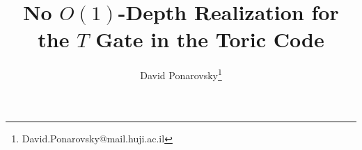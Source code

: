 \documentclass[manuscript,screen,review]{acmart}
\begin{document}

\title{ No $O(1)$-Depth Realization for the $T$ Gate in the Toric Code}
\author{David Ponarovsky\footnote{David.Ponarovsky@mail.huji.ac.il}}
\maketitle

\newcommand*{\xb}{\mathbf{x}}

\ifdefined\SWEEPHEA
\else 
  \newcommand*{\SWEEPHEA}{}
\newcommand{\History}[1]{H_{#1}}
  \newcommand{\Time}[1]{T(#1)}
  \newcommand{\Excuse}[1]{\mathbf{Excuse}(#1)}
  \newcommand{\Excusei}[1]{\mathbf{Excuse}_{i}(#1)}
  \newcommand{\Size}[1]{\mathbf{Size}(#1)}
  \newcommand{\Span}[1]{\mathbf{Span}(#1)}
  \newcommand{\pre}[1]{\text{pre}(#1)}
  \newcommand{\poli}[1]{\text{pole}_{i}(#1)}
  \newcommand{\prei}[1]{\text{pre}_{i}(#1)}
  \newcommand{\predd}[1]{\text{pre}_{d+1}(#1)}
  \newcommand{\rotf}[2]{\theta_{#1 ,#2}}
  \newcommand*{\rotfs}{\rotf{v}{S^{\prime}}}
  \newcommand{\rotfv}[2]{\mathbf{\rotf{#1}{#2} }}
  \newcommand*{\rotfvs}{\mathbf{\rotfs{} }}
\fi

%
%
%
%
\end{document}
